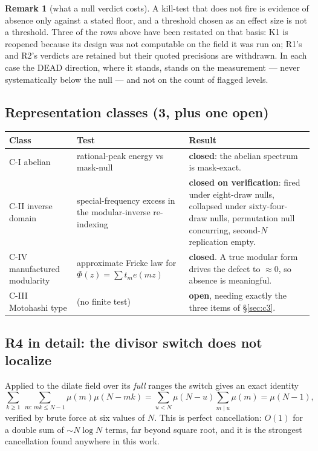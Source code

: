 \documentclass[11pt,a4paper]{article}
\theoremstyle{plain}
\theoremstyle{definition}
\newtheorem{remark}[theorem]{Remark}
\begin{document}
\begin{remark}[what a null verdict costs]
A kill-test that does not fire is evidence of absence only against a
stated floor, and a threshold chosen as an effect size is not a
threshold. Three of the rows above have been restated on that basis:
K1 is reopened because its design was not computable on the field it
was run on; R1's and R2's verdicts are retained but their quoted
precisions are withdrawn. In each case the DEAD direction, where it
stands, stands on the measurement --- never systematically below the
null --- and not on the count of flagged levels.
\end{remark}

\subsection{Representation classes (3, plus one open)}

\begin{longtable}{p{}p{}p{}}
\hline
Class & Test & Result\\
\hline
\endhead
C-I abelian & rational-peak energy vs mask-null &
 \textbf{closed}: the abelian spectrum is mask-exact.\\
C-II inverse domain & special-frequency excess in the
 modular-inverse re-indexing &
 \textbf{closed on verification}: fired under eight-draw nulls,
 collapsed under sixty-four-draw nulls, permutation null concurring,
 second-$N$ replication empty.\\
C-IV manufactured modularity & approximate Fricke law for
 $\Phi(z) = \sum t_m e(mz)$ &
 \textbf{closed}. A true modular form drives the defect to
 $\approx 0$, so absence is meaningful.\\
C-III Motohashi type & (no finite test) &
 \textbf{open}, needing exactly the three items of \S\ref{sec:c3}.\\
\hline
\end{longtable}

\subsection{R4 in detail: the divisor switch does not
localize}\label{sec:R4}

Applied to the dilate field over its \emph{full} ranges the switch
gives an exact identity
\[
  \sum_{k\ge1}\ \sum_{m:\,mk\le N-1}\mu(m)\mu(N-mk)
  = \sum_{u<N}\mu(N-u)\sum_{m\mid u}\mu(m)
  = \mu(N-1),
\]
verified by brute force at six values of $N$. This is perfect
cancellation: $O(1)$ for a double sum of $\sim N\log N$ terms, far
beyond square root, and it is the strongest cancellation found
anywhere in this work.
\end{document}
